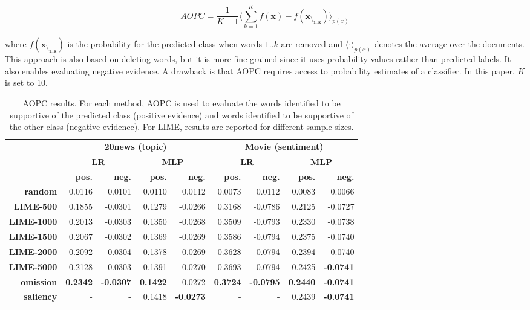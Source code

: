 \documentclass[11pt,a4paper]{article}
\begin{document}
\[AOPC = \frac{1}{K + 1} \langle\sum_{k=1}^{K} f(\bm{x}) - f(\bm{x_{\setminus_{1..k}}})\rangle_{p(x)}\]

\noindent where $f(\bm{x_{\setminus_{1..k}}})$ is the probability for the predicted class when  words $1$..$k$ are removed and $\langle\cdot\rangle_{p(x)}$ denotes the average over the documents. This approach is also based on deleting words, but it is more fine-grained since it uses probability values rather than predicted labels. It also enables evaluating negative evidence. A drawback is that AOPC requires access to  probability estimates of a classifier. In this paper, $K$ is set to 10.





\begin{table*}[t!]
\small
\center
\begin{tabular}{r|rrrr|rrrr}
\toprule
& \multicolumn{4}{c}{\textbf{20news (topic)}} & \multicolumn{4}{|c}{\textbf{Movie (sentiment)}}\\
& \multicolumn{2}{c}{\textbf{LR}} & \multicolumn{2}{c}{\textbf{MLP}} & \multicolumn{2}{|c}{\textbf{LR}} & \multicolumn{2}{c}{\textbf{MLP}}\\
& \textbf{pos.} & \textbf{neg.}& \textbf{pos.} & \textbf{neg.}& \textbf{pos.} & \textbf{neg.}& \textbf{pos.} & \textbf{neg.}\\
\midrule
\textbf{random}	 &0.0116	  & 	0.0101 & 	0.0110& 0.0112	  & 	0.0073	 & 0.0112	 & 	0.0083 & 0.0066	 \\
\textbf{LIME-500}	&0.1855 & -0.0301 &0.1279 & -0.0266 & 0.3168 & -0.0786 & 0.2125	 & -0.0727\\
\textbf{LIME-1000}	& 0.2013	 & 	-0.0303	& 0.1350 &-0.0268 & 0.3509& -0.0793 & 0.2330	 & 	-0.0738\\
\textbf{LIME-1500}&0.2067 & -0.0302	 & 0.1369& 	-0.0269 & 0.3586 & -0.0794 & 0.2375	 & -0.0740\\
\textbf{LIME-2000}	& 0.2092	 & -0.0304 & 0.1378  &	-0.0269 & 0.3628&-0.0794 & 0.2394 & -0.0740\\
\textbf{LIME-5000}	&0.2128 & -0.0303 & 0.1391 & -0.0270& 0.3693& -0.0794 & 0.2425	 &\textbf{-0.0741}\\
\textbf{omission}	& \textbf{0.2342 }&\textbf{-0.0307} & \textbf{0.1422} & -0.0272 & \textbf{0.3724}&\textbf{ -0.0795} &\textbf{ 0.2440 }& \textbf{-0.0741}\\
\textbf{saliency} &- & -& 0.1418 & \textbf{-0.0273} &- &- & 0.2439 &\textbf{ -0.0741}\\
\bottomrule
\end{tabular}
\caption{AOPC results. For each method, AOPC is used  
to evaluate the words identified to be supportive of the predicted class (positive evidence) and words identified to be supportive of the other class (negative evidence). For LIME, results are reported for different sample sizes. }
\label{word_deletion_results_curve}
\end{table*}
\end{document}
